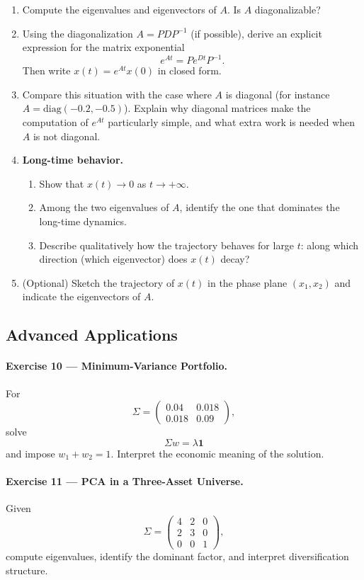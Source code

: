 \documentclass[11pt]{article}
\begin{document}
\begin{enumerate}
  \item Compute the eigenvalues and eigenvectors of $A$. Is $A$ diagonalizable?
  
  \item Using the diagonalization $A = P D P^{-1}$ (if possible), derive an explicit expression for the matrix exponential
  \[
    e^{At} = P e^{Dt} P^{-1}.
  \]
  Then write $x(t) = e^{At} x(0)$ in closed form.
  
  \item Compare this situation with the case where $A$ is diagonal
  (for instance $A = \mathrm{diag}(-0.2,-0.5)$). 
  Explain why diagonal matrices make the computation of $e^{At}$ particularly simple, 
  and what extra work is needed when $A$ is not diagonal.
  
  \item \textbf{Long-time behavior.}
  \begin{enumerate}
    \item Show that $x(t) \to 0$ as $t \to +\infty$.
    \item Among the two eigenvalues of $A$, identify the one that dominates the long-time dynamics.
    \item Describe qualitatively how the trajectory behaves for large $t$:
    along which direction (which eigenvector) does $x(t)$ decay?
  \end{enumerate}
  
  \item (Optional) Sketch the trajectory of $x(t)$ in the phase plane $(x_1,x_2)$ and indicate the eigenvectors of $A$.
\end{enumerate}


\subsection*{Advanced Applications}

\paragraph{Exercise 10 — Minimum-Variance Portfolio.}
For 
\[
\Sigma=\begin{pmatrix}0.04 & 0.018\\ 0.018 & 0.09\end{pmatrix},
\]
solve 
\[
\Sigma w = \lambda \mathbf{1}
\]
and impose $w_1+w_2=1$.
Interpret the economic meaning of the solution.

\paragraph{Exercise 11 — PCA in a Three-Asset Universe.}
Given 
\[
\Sigma=\begin{pmatrix}
4 & 2 & 0\\
2 & 3 & 0\\
0 & 0 & 1
\end{pmatrix},
\]
compute eigenvalues, identify the dominant factor, and interpret diversification structure.
\end{document}
